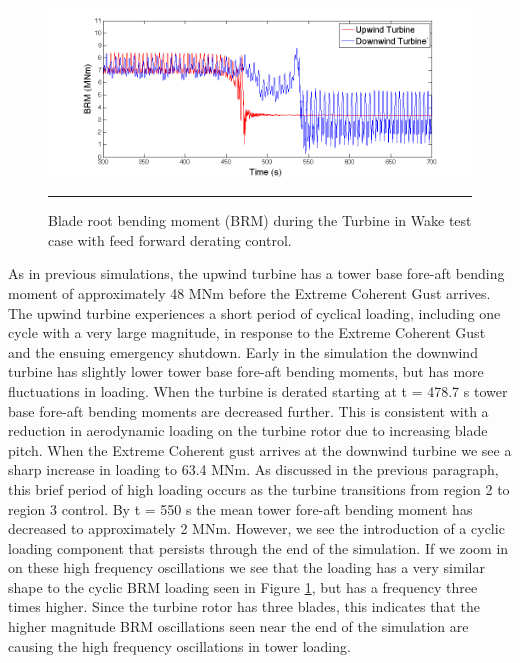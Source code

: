\begin{figure}[htbp] \label{fig6-37}
	\centering
		\includegraphics[trim = {1cm 0 2cm 0}, clip, width = \linewidth]{Figures/ch6Figures/fig6-37.png}
		\rule{35em}{0.5pt}
	\caption{Blade root bending moment (BRM) during the Turbine in Wake test case with feed forward derating control.}
\end{figure}

As in previous simulations, the upwind turbine has a tower base fore-aft bending moment of approximately 48 MNm before the Extreme Coherent Gust arrives. The upwind turbine experiences a short period of cyclical loading, including one cycle with a very large magnitude, in response to the Extreme Coherent Gust and the ensuing emergency shutdown. Early in the simulation the downwind turbine has slightly lower tower base fore-aft bending moments, but has more fluctuations in loading. When the turbine is derated starting at t = 478.7 s tower base fore-aft bending moments are decreased further. This is consistent with a reduction in aerodynamic loading on the turbine rotor due to increasing blade pitch. When the Extreme Coherent gust arrives at the downwind turbine we see a sharp increase in loading to 63.4 MNm. As discussed in the previous paragraph, this brief period of high loading occurs as the turbine transitions from region 2 to region 3 control. By t = 550 s the mean tower fore-aft bending moment has decreased to approximately 2 MNm. However, we see the introduction of a cyclic loading component that persists through the end of the simulation. If we zoom in on these high frequency oscillations we see that the loading has a very similar shape to the cyclic BRM loading seen in Figure \ref{fig6-37}, but has a frequency three times higher. Since the turbine rotor has three blades, this indicates that the higher magnitude BRM oscillations seen near the end of the simulation are causing the high frequency oscillations in tower loading. 

